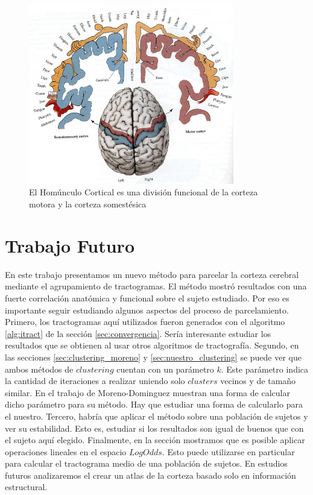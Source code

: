 \begin{figure}[h!]
    \centering
    \includegraphics[width=0.8\textwidth]{img/homunculus.jpg}
    \caption{El Hom\'unculo Cortical es una divisi\'on funcional de la 
             corteza motora y la corteza somest\'esica }
    \label{fig:homunculo}
\end{figure}

\section{Trabajo Futuro}
En este trabajo presentamos un nuevo m\'etodo para parcelar la corteza
cerebral mediante el agrupamiento de tractogramas. El m\'etodo mostr\'o
resultados con una fuerte correlaci\'on anat\'omica y funcional sobre el
sujeto estudiado. Por eso es importante seguir estudiando algunos aspectos
del proceso de parcelamiento. Primero, los tractogramas aqu\'i utilizados
fueron generados con el algoritmo \ref{alg:itract} de la secci\'on 
\ref{sec:convergencia}. Ser\'ia interesante estudiar los resultados
que se obtienen al usar otros algoritmos de tractograf\'ia. Segundo, 
en las secciones \ref{sec:clustering_moreno} y \ref{sec:nuestro_clustering}
se puede ver que ambos m\'etodos de $clustering$
cuentan con un par\'ametro $k$. Este par\'ametro indica la cantidad de iteraciones a realizar uniendo solo $clusters$ vecinos y de tama\~no
similar. En el trabajo de Moreno-Dominguez \cite{Moreno-Dominguez2014} 
muestran una forma de calcular dicho par\'ametro para su m\'etodo. Hay
que estudiar una forma de calcularlo para el nuestro. Tercero, habr\'ia
que aplicar el m\'etodo sobre una poblaci\'on de sujetos y ver su
estabilidad. Esto es, estudiar si los resultados son igual de buenos que
con el sujeto aqu\'i elegido. Finalmente, en la secci\'on 
\label{sec:logit} mostramos que es posible aplicar operaciones
lineales en el espacio $LogOdds$. Esto puede utilizarse en particular para
calcular el tractograma medio de una poblaci\'on de sujetos. En estudios
futuros analizaremos el crear un atlas de la corteza basado solo en
informaci\'on estructural.

